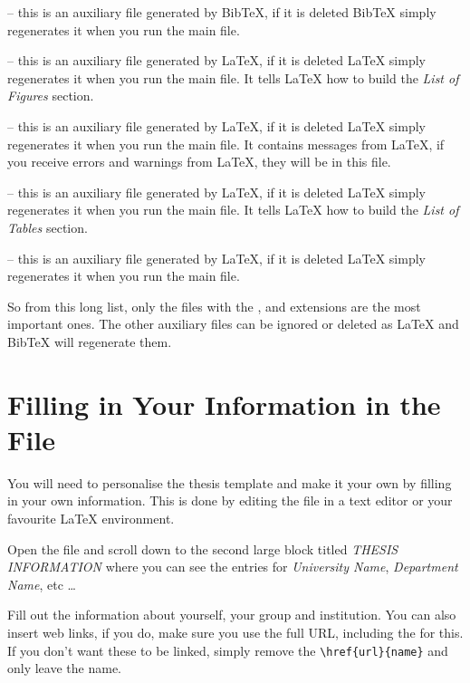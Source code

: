  -- this is an auxiliary file generated by BibTeX, if it is deleted BibTeX simply regenerates it when you run the main  file.

 -- this is an auxiliary file generated by \LaTeX{}, if it is deleted \LaTeX{} simply regenerates it when you run the main  file. It tells \LaTeX{} how to build the \emph{List of Figures} section.

 -- this is an auxiliary file generated by \LaTeX{}, if it is deleted \LaTeX{} simply regenerates it when you run the main  file. It contains messages from \LaTeX{}, if you receive errors and warnings from \LaTeX{}, they will be in this  file.

 -- this is an auxiliary file generated by \LaTeX{}, if it is deleted \LaTeX{} simply regenerates it when you run the main  file. It tells \LaTeX{} how to build the \emph{List of Tables} section.

 -- this is an auxiliary file generated by \LaTeX{}, if it is deleted \LaTeX{} simply regenerates it when you run the main  file.

So from this long list, only the files with the ,  and  extensions are the most important ones. The other auxiliary files can be ignored or deleted as \LaTeX{} and BibTeX will regenerate them.


\section{Filling in Your Information in the  File}\label{FillingFile}

You will need to personalise the thesis template and make it your own by filling in your own information. This is done by editing the  file in a text editor or your favourite LaTeX environment.

Open the file and scroll down to the second large block titled \emph{THESIS INFORMATION} where you can see the entries for \emph{University Name}, \emph{Department Name}, etc \ldots

Fill out the information about yourself, your group and institution. You can also insert web links, if you do, make sure you use the full URL, including the  for this. If you don't want these to be linked, simply remove the \verb|\href{url}{name}| and only leave the name.

